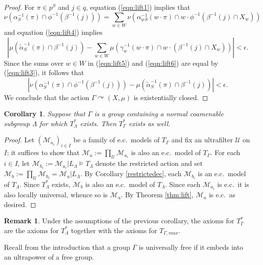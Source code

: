 \documentclass[12pt]{amsart}
\newtheorem{cor}[thm]{Corollary}
\theoremstyle{definition}
\newtheorem{remark}[thm]{Remark}
\def\cal{\mathcal}
\def\u{\mathsf 1}
\def \u{\mathcal U}
\newcommand{\acts}{\curvearrowright}
\begin{document}
\begin{proof}
For $\pi \in p^S$ and $j \in q$, equation (\ref{eqn:lift1}) implies that
\begin{equation} \label{eqn:lift5}
\nu(\alpha_S^{-1}(\pi) \cap \phi^{-1}(\beta^{-1}(j))) = \sum_{w \in W} \nu(\alpha_{w S}^{-1}(w \cdot \pi) \cap w \cdot \phi^{-1}(\beta^{-1}(j) \cap X_w))
\end{equation}
and equation (\ref{eqn:lift4}) implies
\begin{equation} \label{eqn:lift6}
\left| \mu(\tilde{\alpha}_S^{-1}(\pi) \cap \beta^{-1}(j)) - \sum_{w \in W} \mu(\gamma_w^{-1}(w \cdot \pi) \cap w \cdot (\beta^{-1}(j) \cap X_w)) \right| < \epsilon.
\end{equation}
Since the sums over $w \in W$ in (\ref{eqn:lift5}) and (\ref{eqn:lift6}) are equal by (\ref{eqn:lift3}), it follows that
$$\left| \nu(\alpha_S^{-1}(\pi) \cap \phi^{-1}(\beta^{-1}(j))) - \mu(\tilde{\alpha}_S^{-1}(\pi) \cap \beta^{-1}(j)) \right| < \epsilon.$$
We conclude that the action $\Gamma \acts (X, \mu)$ is existentially closed.
\end{proof}

\begin{cor} \label{cor:coam_mc}
Suppose that $\Gamma$ is a group containing a normal coamenable subgroup $\Lambda$ for which $T_\Lambda^*$ exists.  Then $T_\Gamma^*$ exists as well.
\end{cor}

\begin{proof}
Let $(\cal M_{a_i})_{i\in I}$ be a family of e.c.\ models of $T_\Gamma$ and fix an ultrafilter $\u$ on $I$; it suffices to show that $\cal M_a:=\prod_\u \cal M_{a_i}$ is also an e.c.\ model of $T_\Gamma$.  For each $i\in I$, let $\cal M_{b_i}:=\cal M_{a_i}|L_{\Lambda}\models T_{\Lambda}$ denote the restricted action and set $\cal M_b:=\prod_\u \cal M_{b_i}=\cal M_a|L_\Lambda$.  By Corollary \ref{restrictedec}, each $\cal M_{b_i}$ is an e.c.\ model of $T_\Lambda$.  Since $T_\Lambda^*$ exists, $\cal M_b$ is also an e.c.\ model of $T_\Lambda$.  Since each $\cal M_{a_i}$ is e.c.\, it is also locally universal, whence so is $\cal M_a$. By Theorem \ref{thm:lift}, $\cal M_a$ is e.c.\ as desired.
\end{proof}

\begin{remark}
    Under the assumptions of the previous corollary, the axioms for $T_\Gamma^*$ are the axioms for $T_\Lambda^*$ together with the axioms for $T_{\Gamma,max}$.
\end{remark}

Recall from the introduction that a group $\Gamma$ is universally free if it embeds into an ultrapower of a free group.
\end{document}
